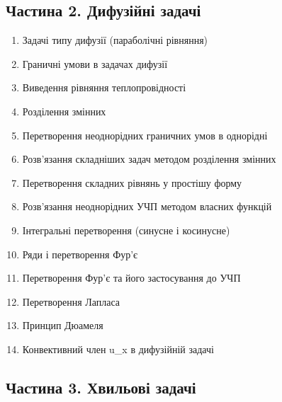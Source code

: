 \documentclass[
  ukrainian,
]{article}
\begin{document}
\subsection{Частина 2. Дифузійні
задачі}\label{ux447ux430ux441ux442ux438ux43dux430-2.-ux434ux438ux444ux443ux437ux456ux439ux43dux456-ux437ux430ux434ux430ux447ux456}

\begin{enumerate}
\def\labelenumi{\arabic{enumi}.}
\setcounter{enumi}{1}
\item
  Задачі типу дифузії (параболічні рівняння)
\item
  Граничні умови в задачах дифузії
\item
  Виведення рівняння теплопровідності
\item
  Розділення змінних
\item
  Перетворення неоднорідних граничних умов в однорідні
\item
  Розв'язання складніших задач методом розділення змінних
\item
  Перетворення складних рівнянь у простішу форму
\item
  Розв'язання неоднорідних УЧП методом власних функцій
\item
  Інтегральні перетворення (синусне і косинусне)
\item
  Ряди і перетворення Фур'є
\item
  Перетворення Фур'є та його застосування до УЧП
\item
  Перетворення Лапласа
\item
  Принцип Дюамеля
\item
  Конвективний член u\_x в дифузійній задачі
\end{enumerate}

\subsection{Частина 3. Хвильові
задачі}\label{ux447ux430ux441ux442ux438ux43dux430-3.-ux445ux432ux438ux43bux44cux43eux432ux456-ux437ux430ux434ux430ux447ux456}
\end{document}
